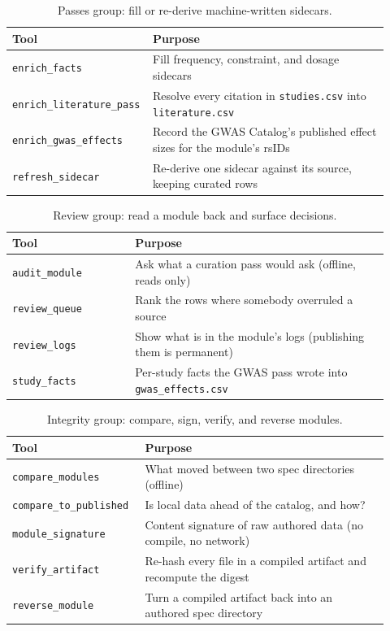 \documentclass[11pt,a4paper]{article}
\begin{document}
\begin{table}[ht]
\centering
\scriptsize
\caption{Passes group: fill or re-derive machine-written sidecars.}
\label{tab:tools-passes}
\begin{tabular}{@{}p{0.30\linewidth}p{0.62\linewidth}@{}}
\toprule
Tool & Purpose \\
\midrule
\texttt{enrich\_facts}             & Fill frequency, constraint, and dosage sidecars \\
\texttt{enrich\_literature\_pass}  & Resolve every citation in \texttt{studies.csv} into \texttt{literature.csv} \\
\texttt{enrich\_gwas\_effects}     & Record the GWAS Catalog's published effect sizes for the module's rsIDs \\
\texttt{refresh\_sidecar}          & Re-derive one sidecar against its source, keeping curated rows \\
\bottomrule
\end{tabular}
\end{table}

\begin{table}[ht]
\centering
\scriptsize
\caption{Review group: read a module back and surface decisions.}
\label{tab:tools-review}
\begin{tabular}{@{}p{0.30\linewidth}p{0.62\linewidth}@{}}
\toprule
Tool & Purpose \\
\midrule
\texttt{audit\_module}   & Ask what a curation pass would ask (offline, reads only) \\
\texttt{review\_queue}   & Rank the rows where somebody overruled a source \\
\texttt{review\_logs}    & Show what is in the module's logs (publishing them is permanent) \\
\texttt{study\_facts}    & Per-study facts the GWAS pass wrote into \texttt{gwas\_effects.csv} \\
\bottomrule
\end{tabular}
\end{table}

\begin{table}[ht]
\centering
\scriptsize
\caption{Integrity group: compare, sign, verify, and reverse modules.}
\label{tab:tools-integrity}
\begin{tabular}{@{}p{0.30\linewidth}p{0.62\linewidth}@{}}
\toprule
Tool & Purpose \\
\midrule
\texttt{compare\_modules}        & What moved between two spec directories (offline) \\
\texttt{compare\_to\_published}  & Is local data ahead of the catalog, and how? \\
\texttt{module\_signature}       & Content signature of raw authored data (no compile, no network) \\
\texttt{verify\_artifact}        & Re-hash every file in a compiled artifact and recompute the digest \\
\texttt{reverse\_module}         & Turn a compiled artifact back into an authored spec directory \\
\bottomrule
\end{tabular}
\end{table}
\end{document}
